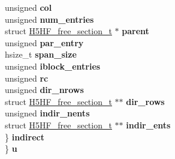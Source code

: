 \begin{DoxyCompactItemize}
\begin{tabbing}
\>\>unsigned {\bfseries col}\\
\>\>unsigned {\bfseries num\_entries}\\
\>\>struct \hyperlink{struct_h5_h_f__free__section__t}{H5HF\_free\_section\_t} $\ast$ {\bfseries parent}\\
\>\>unsigned {\bfseries par\_entry}\\
\>\>hsize\_t {\bfseries span\_size}\\
\>\>unsigned {\bfseries iblock\_entries}\\
\>\>unsigned {\bfseries rc}\\
\>\>unsigned {\bfseries dir\_nrows}\\
\>\>struct \hyperlink{struct_h5_h_f__free__section__t}{H5HF\_free\_section\_t} $\ast$$\ast$ {\bfseries dir\_rows}\\
\>\>unsigned {\bfseries indir\_nents}\\
\>\>struct \hyperlink{struct_h5_h_f__free__section__t}{H5HF\_free\_section\_t} $\ast$$\ast$ {\bfseries indir\_ents}\\
\>\} {\bfseries indirect}\\
\} {\bfseries u}\\


\end{tabbing}
\end{DoxyCompactItemize}
